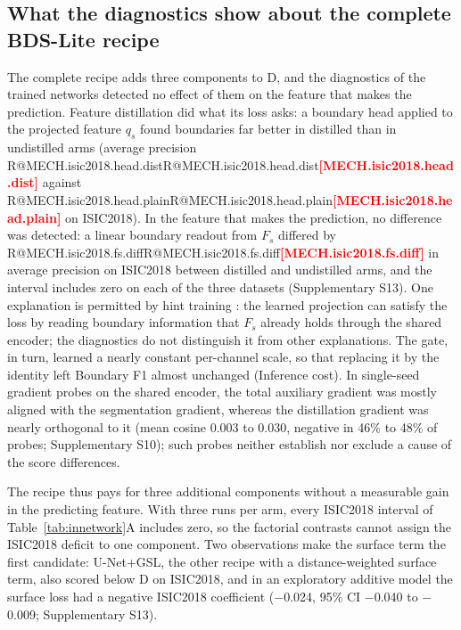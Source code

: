 \documentclass[fleqn,10pt,lineno]{wlpeerj}
\makeatletter
\newcommand{\R}[1]{\ifcsname R@#1\endcsname\csname R@#1\endcsname\else\textbf{\textcolor{red}{[#1]}}\fi}
\makeatother
\begin{document}
\subsection*{What the diagnostics show about the complete BDS-Lite recipe}
The complete recipe adds three components to D, and the diagnostics of the trained networks detected no effect of them on the feature that makes the prediction. Feature distillation did what its loss asks: a boundary head applied to the projected feature $q_s$ found boundaries far better in distilled than in undistilled arms (average precision \R{MECH.isic2018.head.dist} against \R{MECH.isic2018.head.plain} on ISIC2018). In the feature that makes the prediction, no difference was detected: a linear boundary readout from $F_s$ differed by \R{MECH.isic2018.fs.diff} in average precision on ISIC2018 between distilled and undistilled arms, and the interval includes zero on each of the three datasets (Supplementary S13). One explanation is permitted by hint training \citep{Romero2015FitNets}: the learned projection can satisfy the loss by reading boundary information that $F_s$ already holds through the shared encoder; the diagnostics do not distinguish it from other explanations. The gate, in turn, learned a nearly constant per-channel scale, so that replacing it by the identity left Boundary F1 almost unchanged (Inference cost). In single-seed gradient probes on the shared encoder, the total auxiliary gradient was mostly aligned with the segmentation gradient, whereas the distillation gradient was nearly orthogonal to it (mean cosine 0.003 to 0.030, negative in 46\% to 48\% of probes; Supplementary S10); such probes neither establish nor exclude a cause of the score differences.

The recipe thus pays for three additional components without a measurable gain in the predicting feature. With three runs per arm, every ISIC2018 interval of Table~\ref{tab:innetwork}A includes zero, so the factorial contrasts cannot assign the ISIC2018 deficit to one component. Two observations make the surface term the first candidate: U-Net+GSL, the other recipe with a distance-weighted surface term, also scored below D on ISIC2018, and in an exploratory additive model the surface loss had a negative ISIC2018 coefficient ($-$0.024, 95\% CI $-$0.040 to $-$0.009; Supplementary S13).
\end{document}
